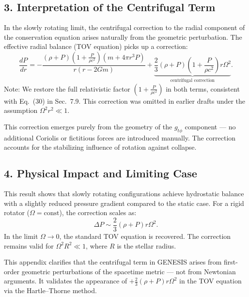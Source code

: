 \documentclass{article}
\begin{document}
\subsection*{3. Interpretation of the Centrifugal Term}
In the slowly rotating limit, the centrifugal correction to the radial component of the conservation equation arises naturally from the geometric perturbation. The effective radial balance (TOV equation) picks up a correction:
\begin{equation}
  \frac{dP}{dr} = -\frac{(\rho + P)\left(1 + \frac{P}{\rho c^2} \right)(m + 4\pi r^3 P)}{r(r - 2Gm)} + \underbrace{\frac{2}{3} (\rho + P)\left(1 + \frac{P}{\rho c^2} \right) r \Omega^2}_{\text{centrifugal correction}}.
\end{equation}
\label{eq:rot-TOV-corrected}
\noindent
Note: We restore the full relativistic factor \( \left(1 + \frac{P}{\rho c^2} \right) \)  
in both terms, consistent with Eq.~(30) in Sec.~7.9.  
This correction was omitted in earlier drafts under the assumption \( \Omega^2 r^2 \ll 1 \).


This correction emerges purely from the geometry of the \( g_{t\phi} \) component — no additional Coriolis or fictitious forces are introduced manually. The correction accounts for the stabilizing influence of rotation against collapse.

\subsection*{4. Physical Impact and Limiting Case}
This result shows that slowly rotating configurations achieve hydrostatic balance with a slightly reduced pressure gradient compared to the static case. For a rigid rotator (\( \Omega = \text{const} \)), the correction scales as:
\begin{equation}
\Delta P \sim \frac{2}{3}(\rho + P) r \Omega^2.
\end{equation}
In the limit \( \Omega \rightarrow 0 \), the standard TOV equation is recovered. The correction remains valid for \( \Omega^2 R^2 \ll 1 \), where \( R \) is the stellar radius.

\begin{tcolorbox}[colback=gray!5, colframe=black!30, title=Why this matters]
This appendix clarifies that the centrifugal term in GENESIS arises from first-order geometric perturbations of the spacetime metric — not from Newtonian arguments. It validates the appearance of \( +\frac{2}{3}(\rho + P) r \Omega^2 \) in the TOV equation via the Hartle–Thorne method.
\end{tcolorbox}
\end{document}
